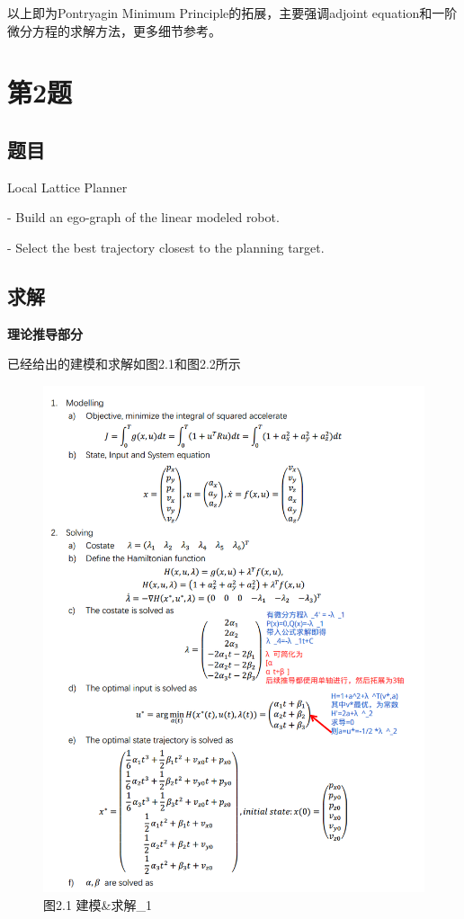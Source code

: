 \documentclass[40pt,a4paper,UTF8]{ctexart}
\numberwithin{equation}{section}
\begin{document}
以上即为Pontryagin Minimum Principle的拓展，主要强调adjoint equation和一阶微分方程的求解方法，更多细节参考\cite{ref2}。

\section{第2题}

\subsection{题目}
Local Lattice Planner

- Build an ego-graph of the linear modeled robot.

- Select the best trajectory closest to the planning target.

\subsection{求解}
\textbf{理论推导部分}

已经给出的建模和求解如图2.1和图2.2所示
\begin{figure}[H]
    \centering
    \includegraphics[width=4.8in]{ch4_16.png} {图2.1 建模\&求解\_1}
\end{figure}
\end{document}
